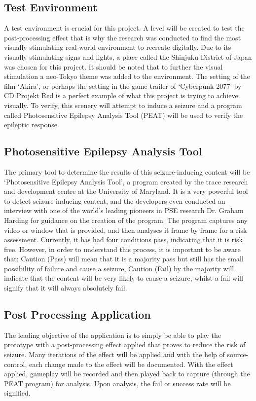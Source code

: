 \documentclass[twocolumn, 10pt, conference]{ieeetran}
\begin{document}
\subsection{Test Environment}
A test environment is crucial for this project. A level will be created to test the post-processing effect that is why the research was conducted to find the most visually stimulating real-world environment to recreate digitally. Due to its visually stimulating signs and lights, a place called the Shinjuku District of Japan was chosen for this project. It should be noted that to further the visual stimulation a neo-Tokyo theme was added to the environment. The setting of the film ‘Akira’, or perhaps the setting in the game trailer of ‘Cyberpunk 2077’ by CD Projekt Red is a perfect example of what this project is trying to achieve visually. To verify, this scenery will attempt to induce a seizure and a program called Photosensitive Epilepsy Analysis Tool (PEAT) will be used to verify the epileptic response.

\subsection{Photosensitive Epilepsy Analysis Tool}
The primary tool to determine the results of this seizure-inducing content will be ‘Photosensitive Epilepsy Analysis Tool’, a program created by the trace research and development centre at the University of Maryland. It is a very powerful tool to detect seizure inducing content, and the developers even conducted an interview with one of the world’s leading pioneers in PSE research Dr. Graham Harding for guidance on the creation of the program. The program captures any video or window that is provided, and then analyses it frame by frame for a risk assessment. Currently, it has had four conditions pass, indicating that it is risk free. However, in order to understand this process, it is important to be aware that: Caution (Pass) will mean that it is a majority pass but still has the small possibility of failure and cause a seizure, Caution (Fail) by the majority will indicate that the content will be very likely to cause a seizure, whilst a fail will signify that it will always absolutely fail.

\subsection{Post Processing Application}
The leading objective of the application is to simply be able to play the prototype with a post-processing effect applied that proves to reduce the risk of seizure. Many iterations of the effect will be applied and with the help of source-control, each change made to the effect will be documented. With the effect applied, gameplay will be recorded and then played back to capture (through the PEAT program) for analysis. Upon analysis, the fail or success rate will be signified.
\end{document}
